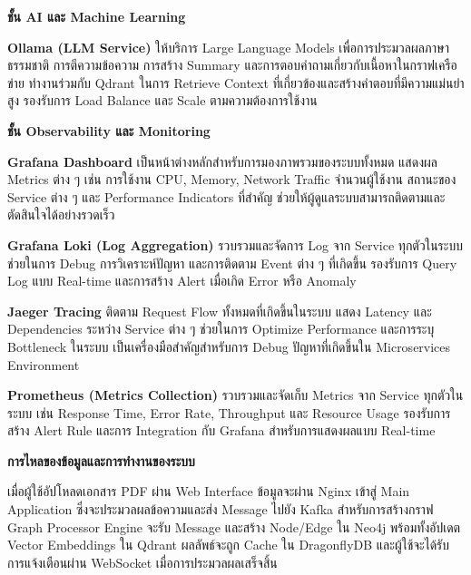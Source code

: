 \documentclass[12pt,a4paper]{article}
\begin{document}
\begin{enumerate}[leftmargin=2cm]
\begin{enumerate}
{            \vspace{0.3cm}

            \textbf{ชั้น AI และ Machine Learning}

            \hspace{1cm}\textbf{Ollama (LLM Service)} ให้บริการ Large Language Models เพื่อการประมวลผลภาษาธรรมชาติ การตีความข้อความ การสร้าง Summary และการตอบคำถามเกี่ยวกับเนื้อหาในกราฟเครือข่าย ทำงานร่วมกับ Qdrant ในการ Retrieve Context ที่เกี่ยวข้องและสร้างคำตอบที่มีความแม่นยำสูง รองรับการ Load Balance และ Scale ตามความต้องการใช้งาน

            \vspace{0.3cm}

            \textbf{ชั้น Observability และ Monitoring}

            \hspace{1cm}\textbf{Grafana Dashboard} เป็นหน้าต่างหลักสำหรับการมองภาพรวมของระบบทั้งหมด แสดงผล Metrics ต่าง ๆ เช่น การใช้งาน CPU, Memory, Network Traffic จำนวนผู้ใช้งาน สถานะของ Service ต่าง ๆ และ Performance Indicators ที่สำคัญ ช่วยให้ผู้ดูแลระบบสามารถติดตามและตัดสินใจได้อย่างรวดเร็ว

            \hspace{1cm}\textbf{Grafana Loki (Log Aggregation)} รวบรวมและจัดการ Log จาก Service ทุกตัวในระบบ ช่วยในการ Debug การวิเคราะห์ปัญหา และการติดตาม Event ต่าง ๆ ที่เกิดขึ้น รองรับการ Query Log แบบ Real-time และการสร้าง Alert เมื่อเกิด Error หรือ Anomaly

            \hspace{1cm}\textbf{Jaeger Tracing} ติดตาม Request Flow ทั้งหมดที่เกิดขึ้นในระบบ แสดง Latency และ Dependencies ระหว่าง Service ต่าง ๆ ช่วยในการ Optimize Performance และการระบุ Bottleneck ในระบบ เป็นเครื่องมือสำคัญสำหรับการ Debug ปัญหาที่เกิดขึ้นใน Microservices Environment

            \hspace{1cm}\textbf{Prometheus (Metrics Collection)} รวบรวมและจัดเก็บ Metrics จาก Service ทุกตัวในระบบ เช่น Response Time, Error Rate, Throughput และ Resource Usage รองรับการสร้าง Alert Rule และการ Integration กับ Grafana สำหรับการแสดงผลแบบ Real-time

            \vspace{0.5cm}

            \textbf{การไหลของข้อมูลและการทำงานของระบบ}

            \hspace{1cm}เมื่อผู้ใช้อัปโหลดเอกสาร PDF ผ่าน Web Interface ข้อมูลจะผ่าน Nginx เข้าสู่ Main Application ซึ่งจะประมวลผลข้อความและส่ง Message ไปยัง Kafka สำหรับการสร้างกราฟ Graph Processor Engine จะรับ Message และสร้าง Node/Edge ใน Neo4j พร้อมทั้งอัปเดต Vector Embeddings ใน Qdrant ผลลัพธ์จะถูก Cache ใน DragonflyDB และผู้ใช้จะได้รับการแจ้งเตือนผ่าน WebSocket เมื่อการประมวลผลเสร็จสิ้น

}
\end{enumerate}
\end{enumerate}
\end{document}
